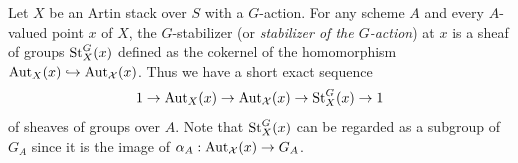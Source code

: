 \begin{definition}\label{rl-001B}
  Let \(X\) be an Artin stack over \(S\) with a \(G\)-action. For any scheme \(A\) and every \(A\)-valued point \(x\) of \(X\), the \(G\)-stabilizer (or \emph{stabilizer of the \(G\)-action}) at \(x\) is a sheaf of groups \(\operatorname{St}^G_X(x)\) defined as the cokernel of the homomorphism \(\operatorname{Aut}_X(x) \hookrightarrow \operatorname{Aut}_{\mathcal X}(x)\). Thus we have a short exact sequence
  \begin{align*}
    1 \to \operatorname{Aut}_X(x) \to \operatorname{Aut}_{\mathcal X}(x) \to \operatorname{St}^G_X(x) \to 1
  \end{align*}
  of sheaves of groups over \(A\). Note that \(\operatorname{St}^G_X(x)\) can be regarded as a subgroup of \(G_A\) since it is the image of \(\alpha_A:\operatorname{Aut}_{\mathcal X}(x) \to G_A\).
\end{definition}
